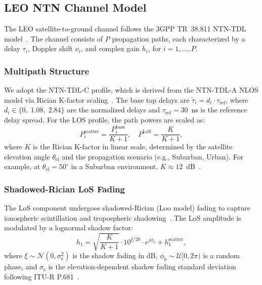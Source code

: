 \subsection{LEO NTN Channel Model}

The LEO satellite-to-ground channel follows the 3GPP TR~38.811 NTN-TDL model~\cite{3gpp_38811}. The channel consists of $P$ propagation paths, each characterized by a delay $\tau_i$, Doppler shift $\nu_i$, and complex gain $h_i$, for $i = 1, \ldots, P$.

\subsubsection{Multipath Structure}
We adopt the NTN-TDL-C profile, which is derived from the NTN-TDL-A NLOS model via Rician K-factor scaling~\cite{3gpp_38901}. The base tap delays are $\tilde{\tau}_i = d_i \cdot \tau_{\mathrm{ref}}$, where $d_i \in \{0,\; 1.08,\; 2.84\}$ are the normalized delays and $\tau_{\mathrm{ref}} = 30$~ns is the reference delay spread. For the LOS profile, the path powers are scaled as:
\begin{equation}\label{eq:kfactor_scaling}
  P_i^{\mathrm{scatter}} = \frac{P_i^{\mathrm{base}}}{K + 1}, \quad
  P^{\mathrm{LoS}} = \frac{K}{K + 1},
\end{equation}
where $K$ is the Rician K-factor in linear scale, determined by the satellite elevation angle $\theta_{\mathrm{el}}$ and the propagation scenario (e.g., Suburban, Urban). For example, at $\theta_{\mathrm{el}} = 50^\circ$ in a Suburban environment, $K \approx 12$~dB~\cite{3gpp_38811}.

\subsubsection{Shadowed-Rician LoS Fading}
The LoS component undergoes shadowed-Rician (Loo model) fading to capture ionospheric scintillation and tropospheric shadowing~\cite{loo_model}. The LoS amplitude is modulated by a lognormal shadow factor:
\begin{equation}\label{eq:los_gain}
  h_1 = \sqrt{\frac{K}{K+1}} \cdot 10^{\xi/20} \cdot e^{j\phi_0} + h_1^{\mathrm{scatter}},
\end{equation}
where $\xi \sim \mathcal{N}(0, \sigma_{\mathrm{s}}^2)$ is the shadow fading in dB, $\phi_0 \sim \mathcal{U}[0, 2\pi)$ is a random phase, and $\sigma_{\mathrm{s}}$ is the elevation-dependent shadow fading standard deviation following ITU-R P.681~\cite{itu_p681}.

